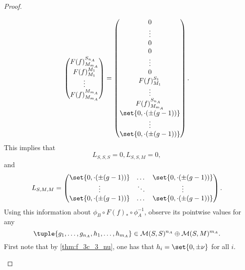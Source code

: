 \begin{proof}
\begin{enumerate}
{\[\begin{pmatrix}
                    F(f)_{M_{m_A}}^{S_{n_A}} \\
                    F(f)_{M_1}^{M_1} \\
                    \vdots \\
                    F(f)_{M_{m_A}}^{M_{m_A}}
                \end{pmatrix}
                =
                \begin{pmatrix}
                    0 \\
                    \vdots \\
                    0 \\
                    0 \\
                    \vdots \\
                    0 \\
                    F(f)_{M_1}^{S_1} \\
                    \vdots \\
                    F(f)_{M_{m_A}}^{S_{n_A}} \\
                    \set{0, \cdot(\pm(g - 1))} \\
                    \vdots \\
                    \set{0, \cdot(\pm(g - 1))}
                \end{pmatrix}.
            \]
            This implies that
            \[
                L_{S, S, S} = 0, L_{S, S, M} = 0,
            \]
            and
            \[
                L_{S, M, M} =
                \begin{pmatrix}
                    \set{0, \cdot(\pm(g - 1))} & \dots & \set{0, \cdot(\pm(g - 1))} \\
                    \vdots & \ddots & \vdots \\
                    \set{0, \cdot(\pm(g - 1))} & \dots & \set{0, \cdot(\pm(g - 1))}
                \end{pmatrix}.
            \]
            Using this information about \( \phi_B \circ F(f)_* \circ \phi_A^{-1} \), observe its pointwise values for any 
            \[
                \tuple{g_1, \dots, g_{n_A}, h_1, \dots, h_{m_A}} \in \Mc(S, S)^{n_A} \oplus \Mc(S, M)^{m_A}.
            \]
            First note that by \autoref{thm:f_3c_3_nu}, one has that \( h_i = \set{0, \pm \nu} \) for all \( i \).

}
\end{enumerate}
\end{proof}

